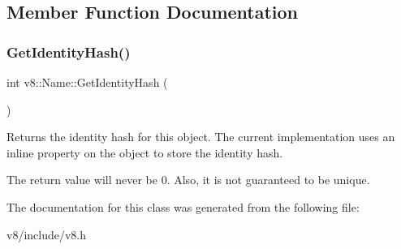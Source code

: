 \subsection{Member Function Documentation}
\mbox{\label{classv8_1_1Name_aef60fce47685fad12914304f6bc52bf2}} 
\subsubsection{\texorpdfstring{Get\+Identity\+Hash()}{GetIdentityHash()}}
{\footnotesize\ttfamily int v8\+::\+Name\+::\+Get\+Identity\+Hash (\begin{DoxyParamCaption}{ }\end{DoxyParamCaption})}

Returns the identity hash for this object. The current implementation uses an inline property on the object to store the identity hash.

The return value will never be 0. Also, it is not guaranteed to be unique. 

The documentation for this class was generated from the following file\+:\begin{DoxyCompactItemize}
\item 
v8/include/v8.\+h\end{DoxyCompactItemize}
